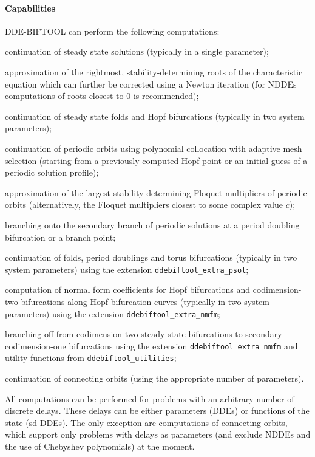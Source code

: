 \documentclass[10pt]{scrartcl}
\newcommand{\DDEBIFCODE}{\textsc{DDE-BIFTOOL}}
\begin{document}
\paragraph{Capabilities}
{\DDEBIFCODE} can perform the following computations:
\begin{compactitem}
\item continuation of steady state solutions (typically in a single
  parameter);
\item approximation of the rightmost, stability-determining roots of
  the characteristic equation which can further be corrected using a
  Newton iteration (for NDDEs computations of roots closest to $0$ is
  recommended);
\item continuation of steady state folds and Hopf bifurcations
  (typically in two system parameters);
\item continuation of periodic orbits using polynomial collocation
  with adaptive mesh selection (starting from a previously computed
  Hopf point or an initial guess of a periodic solution profile);
\item approximation of the largest stability-determining Floquet
  multipliers of periodic orbits (alternatively, the Floquet
  multipliers closest to some complex value $c$);
\item branching onto the secondary branch of periodic solutions at a
  period doubling bifurcation or a branch point;
\item continuation of folds, period doublings and torus bifurcations
  (typically in two system parameters) using the extension
  \texttt{ddebiftool\_extra\_psol};
\item computation of normal form coefficients for Hopf bifurcations
  and codimension-two bifurcations along Hopf bifurcation curves
  (typically in two system parameters) using the extension
  \texttt{ddebiftool\_extra\_nmfm};
\item branching off from codimension-two steady-state bifurcations to
  secondary codimension-one bifurcations using the extension
  \texttt{ddebiftool\_extra\_nmfm} and utility functions from
  \texttt{ddebiftool\_utilities};
\item continuation of connecting orbits (using the appropriate number
  of parameters).  
\end{compactitem}
All computations can be performed for problems with an arbitrary
number of discrete delays. These delays can be either parameters
(DDEs) or functions of the state (sd-DDEs).  The only exception are
computations of connecting orbits, which support only problems with
delays as parameters (and exclude NDDEs and the use of Chebyshev
polynomials) at the moment.
\end{document}
